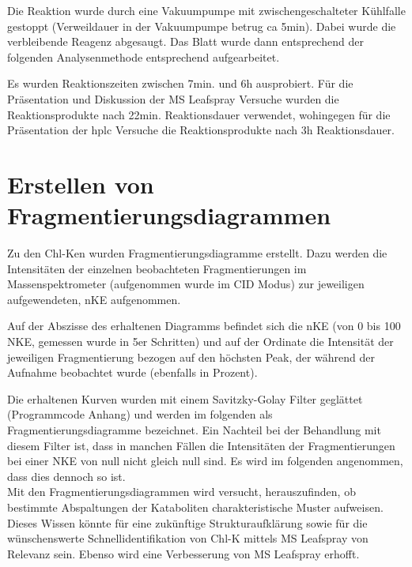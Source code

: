 Die Reaktion wurde durch eine Vakuumpumpe mit zwischengeschalteter Kühlfalle gestoppt (Verweildauer in der Vakuumpumpe betrug \gls{ca} 5min). Dabei wurde die verbleibende Reagenz abgesaugt. Das Blatt wurde dann entsprechend der folgenden Analysenmethode entsprechend aufgearbeitet.

Es wurden Reaktionszeiten zwischen 7min. und 6h ausprobiert. Für die Präsentation und Diskussion der MS Leafspray Versuche wurden die Reaktionsprodukte nach 22min. Reaktionsdauer verwendet, wohingegen für die Präsentation der \gls{hplc} Versuche die Reaktionsprodukte nach 3h Reaktionsdauer.

\section{Erstellen von Fragmentierungsdiagrammen} \label{sec:fragmentierungsdiagramme}

Zu den \gls{Chl-K}en wurden Fragmentierungsdiagramme erstellt. Dazu werden die Intensitäten der einzelnen beobachteten Fragmentierungen im Massenspektrometer (aufgenommen wurde im CID Modus) zur jeweiligen aufgewendeten, \gls{nKE} aufgenommen. 

Auf der Abszisse des erhaltenen Diagramms befindet sich die \gls{nKE} (von 0 bis 100 NKE, gemessen wurde in 5er Schritten) und auf der Ordinate die Intensität der jeweiligen Fragmentierung bezogen auf den höchsten Peak, der während der Aufnahme beobachtet wurde (ebenfalls in Prozent). 

Die erhaltenen Kurven wurden mit einem Savitzky-Golay Filter \cite{scipy} geglättet (Programmcode Anhang) und werden im folgenden als Fragmentierungsdiagramme bezeichnet. Ein Nachteil bei der Behandlung mit diesem Filter ist, dass in manchen Fällen die Intensitäten der Fragmentierungen bei einer NKE von null nicht gleich null sind. Es wird im folgenden angenommen, dass dies dennoch so ist. \\

Mit den Fragmentierungsdiagrammen wird versucht, herauszufinden, ob bestimmte Abspaltungen der Kataboliten charakteristische Muster aufweisen. Dieses Wissen könnte für eine zukünftige Strukturaufklärung sowie für die wünschenswerte Schnellidentifikation von \gls{Chl-K} mittels MS Leafspray von Relevanz sein. Ebenso wird eine Verbesserung von MS Leafspray erhofft.